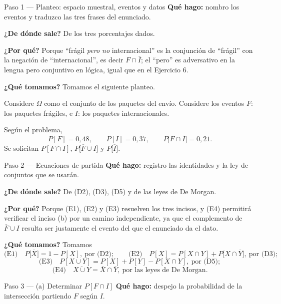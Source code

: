 \documentclass[11pt]{article}
\begin{document}
\begin{sol}

\begin{paso}{Paso 1 --- Planteo: espacio muestral, eventos y datos}
\textbf{Qué hago:} nombro los eventos y traduzco las tres frases del enunciado.

\textbf{¿De dónde sale?} De los tres porcentajes dados.

\textbf{¿Por qué?} Porque ``frágil \emph{pero no} internacional'' es la conjunción de ``frágil''
con la negación de ``internacional'', es decir $F\cap\overline{I}$; el ``pero'' es adversativo en
la lengua pero conjuntivo en lógica, igual que en el Ejercicio 6.

\textbf{¿Qué tomamos?} Tomamos el siguiente planteo.

\medskip
Considere $\Omega$ como el conjunto de los paquetes del envío. Considere los eventos $F$: los
paquetes frágiles, e $I$: los paquetes internacionales.

Según el problema,
\[
P[F]=0{,}48,\qquad P[I]=0{,}37,\qquad P\big[F\cap\overline{I}\big]=0{,}21 .
\]
Se solicitan $P[F\cap I]$, $P\big[\overline{F}\cup I\big]$ y $P\big[\overline{I}\big]$.
\end{paso}

\begin{paso}{Paso 2 --- Ecuaciones de partida}
\textbf{Qué hago:} registro las identidades y la ley de conjuntos que se usarán.

\textbf{¿De dónde sale?} De (D2), (D3), (D5) y de las leyes de De Morgan.

\textbf{¿Por qué?} Porque (E1), (E2) y (E3) resuelven los tres incisos, y (E4) permitirá
verificar el inciso (b) por un camino independiente, ya que el complemento de
$\overline{F}\cup I$ resulta ser justamente el evento del que el enunciado da el dato.

\textbf{¿Qué tomamos?} Tomamos
\[
\text{(E1)}\quad P\big[\overline{X}\big]=1-P[X],\ \text{por (D2)};
\qquad
\text{(E2)}\quad P[X]=P[X\cap Y]+P\big[X\cap\overline{Y}\big],\ \text{por (D3)};
\]
\[
\text{(E3)}\quad P[X\cup Y]=P[X]+P[Y]-P[X\cap Y],\ \text{por (D5)};
\]
\[
\text{(E4)}\quad \overline{X\cup Y}=\overline{X}\cap\overline{Y},\ \text{por las leyes de De Morgan}.
\]
\end{paso}

\begin{paso}{Paso 3 --- (a) Determinar $P[F\cap I]$}
\textbf{Qué hago:} despejo la probabilidad de la intersección partiendo $F$ según $I$.


\end{paso}
\end{sol}
\end{document}
